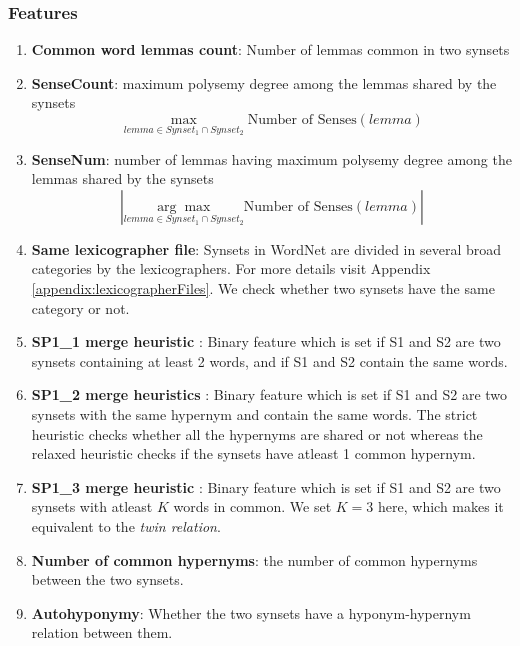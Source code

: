 \subsubsection{Features}
\begin{enumerate}
\item \textbf{Common word lemmas count}: Number of lemmas common in two synsets
\item \textbf{SenseCount}: maximum polysemy degree among the lemmas shared by the synsets
\begin{equation*}
\underset{lemma \in Synset_1 \cap Synset_2}{\max} \mbox{Number of Senses}(lemma)
\end{equation*}

\item \textbf{SenseNum}: number of lemmas having maximum polysemy degree among the lemmas shared by the synsets
\begin{equation*}
\left|\underset{lemma \in Synset_1 \cap Synset_2}{\arg\max} \mbox{Number of Senses}(lemma)\right|
\end{equation*}

\item \textbf{Same lexicographer file}: Synsets in WordNet are divided in several broad categories by the lexicographers. For more details visit Appendix \ref{appendix:lexicographerFiles}.
We check whether two synsets have the same category or not. 


\item \textbf{SP1\_1 merge heuristic} \citep{Mihalcea01ez.wordnet:principles}: Binary feature which is set if S1 and S2 are two synsets containing at least 2 words, and if S1 and S2 contain the same words.
\item \textbf{SP1\_2 merge heuristics} \citep{Mihalcea01ez.wordnet:principles}: Binary feature which is set if S1 and S2 are two synsets with the same hypernym and contain the same words. The strict heuristic checks whether all the hypernyms are shared or not whereas the relaxed heuristic checks if the synsets have atleast 1 common hypernym.
\item \textbf{SP1\_3 merge heuristic} \citep{Mihalcea01ez.wordnet:principles}: Binary feature which is set if S1 and S2 are two synsets with atleast $K$ words in common. We set $K=3$ here, which makes it equivalent to the \textit{twin relation}.

\item \textbf{Number of common hypernyms}: the number of common hypernyms between the two synsets.

\item \textbf{Autohyponymy}: Whether the two synsets have a hyponym-hypernym relation between them.

\end{enumerate}

